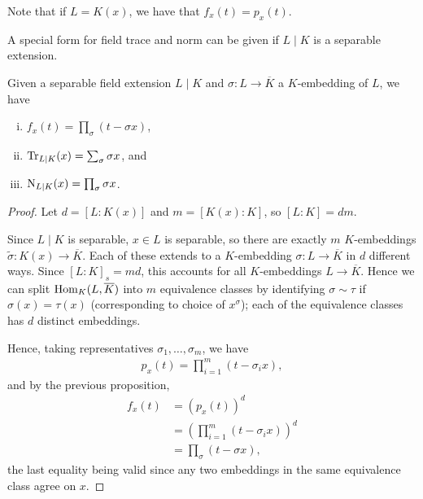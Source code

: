 Note that if $L=K(x)$, we have that $f_x(t)=p_x(t)$.


A special form for field trace and norm can be given if $L\mid K$ is a separable extension.

\begin{prop}
	Given a separable field extension $L\mid K$ and $\sigma : L\to\overline{K}$ a $K$-embedding of $L$, we have
	\begin{enumerate}[(i)]
		\item $f_x(t)= \prod_\sigma(t-\sigma x)$,
		\item $\operatorname{Tr}_{L\mid K}(x) = \sum_\sigma \sigma x$, and
		\item $\operatorname{N}_{L\mid K}(x) = \prod_\sigma \sigma x$.
	\end{enumerate}
\end{prop}
\begin{proof}
	Let $d=[L:K(x)]$ and $m=[K(x):K]$, so $[L:K]=dm$.

	Since $L\mid K$ is separable, $x\in L$ is separable, so there are exactly $m$ $K$-embeddings $\tilde{\sigma}:K(x)\to \overline{K}$. Each of these extends to a $K$-embedding $\sigma: L\to \overline{K}$ in $d$ different ways. Since $[L:K]_s=md$, this accounts for all $K$-embeddings $L\to\overline{K}$. Hence we can split $\text{Hom}_K(L,\overline{K})$ into $m$ equivalence classes by identifying $\sigma \sim \tau$ if $\sigma(x)=\tau(x)$ (corresponding to choice of $x^\sigma$); each of the equivalence classes has $d$ distinct embeddings.


	Hence, taking representatives $\sigma_1,\dots,\sigma_m$, we have
	\begin{align*}
		p_x(t) = \prod_{i=1}^m (t- \sigma_i x),
	\end{align*}
	and by the previous proposition,
	\begin{align*}
		f_x(t) &= \left( p_x(t)\right)^d\\
			&= \left(\prod_{i=1}^m (t-\sigma_i x)\right)^d\\
			&= \prod_\sigma (t-\sigma x),
	\end{align*}
	the last equality being valid since any two embeddings in the same equivalence class agree on $x$.


\end{proof}
